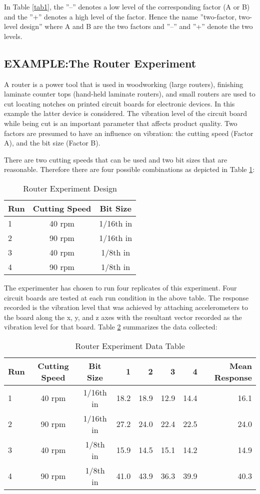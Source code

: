 In Table \ref{tab1}, the ''--'' denotes a low level of the corresponding factor (A or B) and the ''+'' denotes a high level of the factor.  Hence the name ''two-factor, two-level design'' where A and B are the two factors and ''--'' and ''+'' denote the two levels.

\subsection{EXAMPLE:The Router Experiment} 
\label{router}
A router is a power tool that is used in woodworking (large routers), finishing laminate counter tops (hand-held laminate routers), and small routers are used to cut locating notches on printed circuit boards for electronic devices. In this example the latter device is considered.  The vibration level of the circuit board while being cut is an important parameter that affects product quality.  Two factors are presumed to have an influence on vibration: the cutting speed (Factor A), and the bit size (Factor B).

There are two cutting speeds that can be used and two bit sizes that are reasonable.  Therefore there are four possible combinations as depicted in Table \ref{tab2}:
\begin{table}[h]\caption{Router Experiment Design}\label{tab2}
\begin{center}
\begin{tabular}{|l|c|c|}
\hline Run & Cutting Speed & Bit Size \\ 
\hline 1 & 40 rpm & 1/16th in \\ 
\hline 2 & 90 rpm & 1/16th in \\ 
\hline 3 & 40 rpm & 1/8th in \\ 
\hline 4 & 90 rpm & 1/8th in \\ 
\hline 
\end{tabular} 
\end{center}
\end{table}
The experimenter has chosen to run four replicates of this experiment.  Four circuit boards are tested at each run condition in the above table.  The response recorded is the vibration level that was achieved by attaching accelerometers to the board along the x, y, and z axes with the resultant vector recorded as the vibration level for that board.  Table \ref{tab3} summarizes the data collected:
\begin{table}[h]\caption{Router Experiment Data Table}\label{tab3}
\begin{center}\small
\begin{tabular}{|l|c|c|r|r|r|r|r|}
\hline Run & Cutting Speed & Bit Size & 1 & 2 & 3 & 4 & Mean Response \\ 
\hline 1 & 40 rpm & 1/16th in & 18.2 & 18.9 & 12.9 & 14.4 & 16.1\\ 
\hline 2 & 90 rpm & 1/16th in & 27.2 & 24.0 & 22.4 & 22.5 & 24.0\\ 
\hline 3 & 40 rpm & 1/8th in & 15.9 & 14.5 & 15.1 & 14.2 & 14.9\\ 
\hline 4 & 90 rpm & 1/8th in & 41.0 & 43.9 & 36.3 & 39.9 & 40.3\\ 
\hline 
\end{tabular} 
\end{center}
\end{table}
